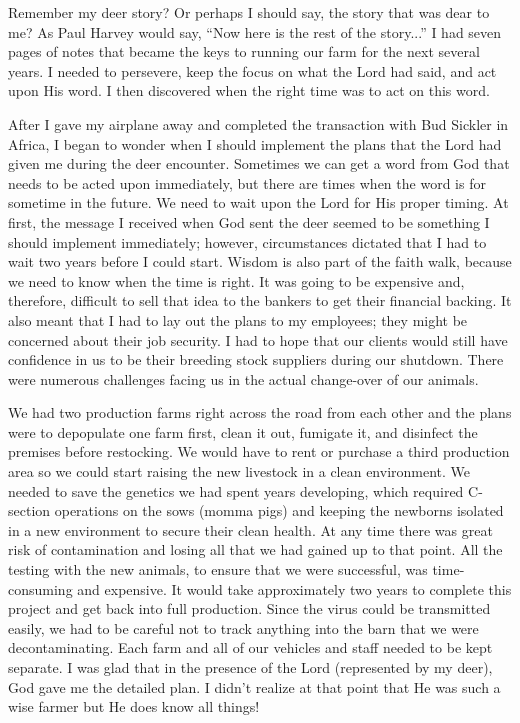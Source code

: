\documentclass[twoside, 12pt]{book}
\begin{document}
Remember my deer story? Or perhaps I should say, the story that was dear to me? As Paul Harvey would say, “Now here is the rest of the story...” I had seven pages of notes that became the keys to running our farm for the next several years. I needed to persevere, keep the focus on what the Lord had said, and act upon His word. I then discovered when the right time was to act on this word.

After I gave my airplane away and completed the transaction with Bud Sickler in Africa, I began to wonder when I should implement the plans that the Lord had given me during the deer encounter. Sometimes we can get a word from God that needs to be acted upon immediately, but there are times when the word is for sometime in the future. We need to wait upon the Lord for His proper timing. At first, the message I received when God sent the deer seemed to be something I should implement immediately; however, circumstances dictated that I had to wait two years before I could start. Wisdom is also part of the faith walk, because we need to know when the time is right. It was going to be expensive and, therefore, difficult to sell that idea to the bankers to get their financial backing. It also meant that I had to lay out the plans to my employees; they might be concerned about their job security. I had to hope that our clients would still have confidence in us to be their breeding stock suppliers during our shutdown. There were numerous challenges facing us in the actual change-over of our animals. 
 
We had two production farms right across the road from each other and the plans were to depopulate one farm first, clean it out, fumigate it, and disinfect the premises before restocking. We would have to rent or purchase a third production area so we could start raising the new livestock in a clean environment. We needed to save the genetics we had spent years developing, which required C-section operations on the sows (momma pigs) and keeping the newborns isolated in a new environment to secure their clean health. At any time there was great risk of contamination and losing all that we had gained up to that point. All the testing with the new animals, to ensure that we were successful, was time-consuming and expensive. It would take approximately two years to complete this project and get back into full production. Since the virus could be transmitted easily, we had to be careful not to track anything into the barn that we were decontaminating. Each farm and all of our vehicles and staff needed to be kept separate. I was glad that in the presence of the Lord (represented by my deer), God gave me the detailed plan. I didn’t realize at that point that He was such a wise farmer but He does know all things!
\end{document}
